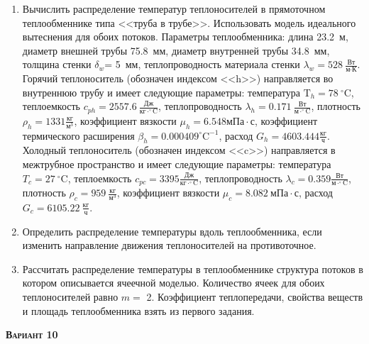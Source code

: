 \begin{enumerate} 
\item Вычислить распределение температур теплоносителей в прямоточном теплообменнике типа <<труба в трубе>>. Использовать модель идеального вытеснения для обоих потоков. Параметры теплообменника: длина  23.2~м, диаметр внешней трубы 75.8~мм,  диаметр внутренней трубы 34.8~мм, толщина стенки $\delta_{w}$=     5~мм,  теплопроводность материала стенки $\lambda_{w}=  528~\frac{\text{Вт}}{\text{м} \cdot \text{К}}$.  Горячий теплоноситель (обозначен индексом <<h>>) направляется во внутреннюю трубу и	 имеет следующие параметры: температура $\text{T}_{h}=  78~^\circ\mathrm{C}$, теплоемкость	  $c_{p{h}}= 2557.6~\frac{\text{Дж}}{\text{кг} \cdot ^\circ\mathrm{C}}$, теплопроводность 		$\lambda_{h}= 0.171~\frac{\text{Вт}}{\text{м} \cdot ^\circ\mathrm{C}}$, плотность 		$\rho_{h}= 1331 \frac{\text{кг}}{\text{м}^3}$, коэффициент вязкости $\mu_{h}=6.548 \text{мПа} 		\cdot \text{с} $, коэффициент термического расширения $\beta_{h}=0.000409 ^\circ\mathrm{C}^{-1}$,		 расход $G_{h}= 4603.444 \frac{\text{кг}}{\text{ч}}$. Холодный теплоноситель (обозначен индексом <<c>>) 		 направляется в межтрубное пространство и имеет следующие параметры: температура $T_{c}=   27		 ~^\circ\mathrm{C}$, теплоемкость $c_{p{c}}= 3395 \frac{\text{Дж}}{\text{кг} \cdot ^\circ\mathrm{C}}$,			 теплопроводность $\lambda_{c}=0.359 \frac{\text{Вт}}{\text{м} \cdot ^\circ\mathrm{C}}$, плотность 			 $\rho_{c}=   959~\frac{\text{кг}}{\text{м}^3}$, коэффициент вязкости $\mu_{c}=8.082~\text{мПа} \cdot \text{с} $, 			 расход $G_{c}=6105.22~\frac{\text{кг}}{\text{ч}}$. 

\item Определить распределение температуры вдоль теплообменника, если 	изменить направление движения теплоносителей на противоточное.

\item Рассчитать распределение температуры в теплообменнике структура потоков в котором описывается ячеечной моделью. Количество ячеек для обоих теплоносителей равно $m = $ 2. Коэффициент теплопередачи, свойства веществ и площадь теплообменника взять из первого задания.

\end{enumerate}

\textsc{\textbf{Вариант 10}}

